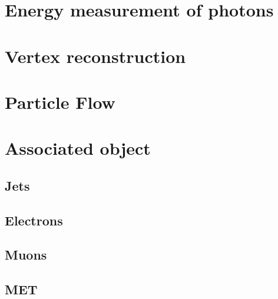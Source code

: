 \section{Energy measurement of photons}
\label{sec:photon_energy}

\section{Vertex reconstruction}
\label{sec:vtx_reco}


\section{Particle Flow}

\section{Associated object}
\subsection{Jets}
\subsection{Electrons}
\subsection{Muons}
\subsection{MET}

